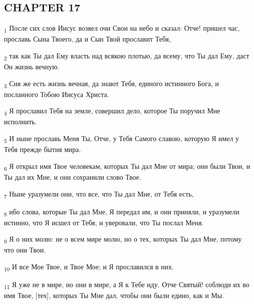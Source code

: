\subsection{CHAPTER 17}
\begin{tcolorbox}
\textsubscript{1} После сих слов Иисус возвел очи Свои на небо и сказал: Отче! пришел час, прославь Сына Твоего, да и Сын Твой прославит Тебя,
\end{tcolorbox}
\begin{tcolorbox}
\textsubscript{2} так как Ты дал Ему власть над всякою плотью, да всему, что Ты дал Ему, даст Он жизнь вечную.
\end{tcolorbox}
\begin{tcolorbox}
\textsubscript{3} Сия же есть жизнь вечная, да знают Тебя, единого истинного Бога, и посланного Тобою Иисуса Христа.
\end{tcolorbox}
\begin{tcolorbox}
\textsubscript{4} Я прославил Тебя на земле, совершил дело, которое Ты поручил Мне исполнить.
\end{tcolorbox}
\begin{tcolorbox}
\textsubscript{5} И ныне прославь Меня Ты, Отче, у Тебя Самого славою, которую Я имел у Тебя прежде бытия мира.
\end{tcolorbox}
\begin{tcolorbox}
\textsubscript{6} Я открыл имя Твое человекам, которых Ты дал Мне от мира; они были Твои, и Ты дал их Мне, и они сохранили слово Твое.
\end{tcolorbox}
\begin{tcolorbox}
\textsubscript{7} Ныне уразумели они, что все, что Ты дал Мне, от Тебя есть,
\end{tcolorbox}
\begin{tcolorbox}
\textsubscript{8} ибо слова, которые Ты дал Мне, Я передал им, и они приняли, и уразумели истинно, что Я исшел от Тебя, и уверовали, что Ты послал Меня.
\end{tcolorbox}
\begin{tcolorbox}
\textsubscript{9} Я о них молю: не о всем мире молю, но о тех, которых Ты дал Мне, потому что они Твои.
\end{tcolorbox}
\begin{tcolorbox}
\textsubscript{10} И все Мое Твое, и Твое Мое; и Я прославился в них.
\end{tcolorbox}
\begin{tcolorbox}
\textsubscript{11} Я уже не в мире, но они в мире, а Я к Тебе иду. Отче Святый! соблюди их во имя Твое, [тех], которых Ты Мне дал, чтобы они были едино, как и Мы.
\end{tcolorbox}
